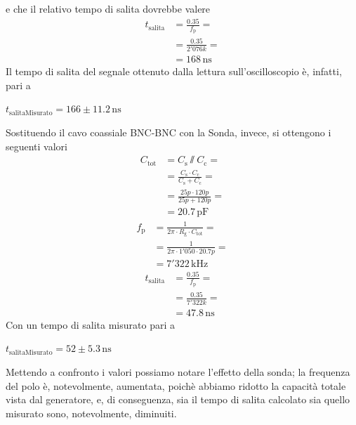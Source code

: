 \documentclass[a4paper]{article}
\begin{document}
				e che il relativo tempo di salita dovrebbe valere
				\begin{equation*}
					\begin{split}
						t_{\mathrm{salita}} &= \frac{0.35}{f_{\mathrm{p}}} = \\
											&= \frac{0.35}{2'076k} = \\
											&= 168 \, \mathrm{ns}
					\end{split}
				\end{equation*}
				Il tempo di salita del segnale ottenuto dalla lettura sull'oscilloscopio è, infatti, pari a
				\newline
				\begin{center}
					$ t_{\mathrm{salitaMisurato}} = 166 \pm 11.2 \, \mathrm{ns} $
				\end{center}
				\newline
				Sostituendo il cavo coassiale BNC-BNC con la Sonda, invece, si ottengono i seguenti valori
				\begin{equation*}
					\begin{split}
						C_{\mathrm{tot}} &= C_{\mathrm{s}} \sslash C_{\mathrm{c}} = \\
										 &= \frac{C_{\mathrm{s}} \cdot C_{\mathrm{c}}}{C_{\mathrm{s}} + C_{\mathrm{c}}} =\\
										 &= \frac{25p \cdot 120p}{25p + 120p} =\\
										 &= 20.7 \, \mathrm{pF}
					\end{split}
				\end{equation*}
				\begin{equation*}
					\begin{split}
						f_{\mathrm{p}} &= \frac{1}{2 \pi \cdot R_{\mathrm{g}} \cdot C_{\mathrm{tot}}} = \\
									   &= \frac{1}{2 \pi \cdot 1'050 \cdot 20.7p} = \\
									   &= 7'322 \, \mathrm{kHz}
					\end{split}
				\end{equation*}
				\begin{equation*}
					\begin{split}
						t_{\mathrm{salita}} &= \frac{0.35}{f_{\mathrm{p}}} = \\
											&= \frac{0.35}{7'322k} = \\
											&= 47.8 \, \mathrm{ns}
					\end{split}
				\end{equation*}
				Con un tempo di salita misurato pari a
				\newline
				\begin{center}
					$ t_{\mathrm{salitaMisurato}} = 52 \pm 5.3 \, \mathrm{ns} $
				\end{center}
				Mettendo a confronto i valori possiamo notare l'effetto della sonda; la frequenza del polo è, notevolmente, aumentata, poichè abbiamo ridotto la capacità totale vista dal generatore, e, di conseguenza, sia il tempo di salita calcolato sia quello misurato sono, notevolmente, diminuiti.
\end{document}
